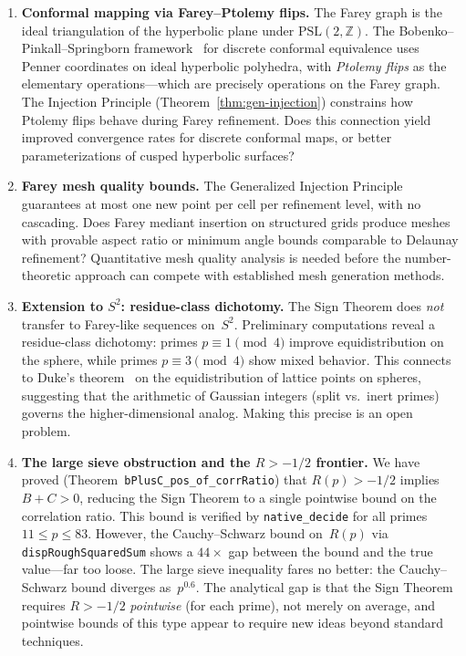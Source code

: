 \documentclass[11pt]{article}
\theoremstyle{definition}
\newcommand{\Z}{\mathbb{Z}}
\begin{document}
\begin{enumerate}
  \item \textbf{Conformal mapping via Farey--Ptolemy flips.}
    The Farey graph is the ideal triangulation of the hyperbolic
    plane under $\mathrm{PSL}(2,\Z)$.  The Bobenko--Pinkall--Springborn
    framework~\cite{BPS2015} for discrete conformal equivalence
    uses Penner coordinates on ideal hyperbolic polyhedra, with
    \emph{Ptolemy flips} as the elementary operations---which are
    precisely operations on the Farey graph.  The Injection
    Principle (Theorem~\ref{thm:gen-injection}) constrains how
    Ptolemy flips behave during Farey refinement.  Does this
    connection yield improved convergence rates for discrete
    conformal maps, or better parameterizations of cusped
    hyperbolic surfaces?

  \item \textbf{Farey mesh quality bounds.}
    The Generalized Injection Principle guarantees at most one
    new point per cell per refinement level, with no cascading.
    Does Farey mediant insertion on structured grids produce
    meshes with provable aspect ratio or minimum angle bounds
    comparable to Delaunay refinement?  Quantitative mesh
    quality analysis is needed before the number-theoretic
    approach can compete with established mesh generation methods.

  \item \textbf{Extension to $S^2$: residue-class dichotomy.}
    The Sign Theorem does \emph{not} transfer to Farey-like
    sequences on~$S^2$.  Preliminary computations reveal a
    residue-class dichotomy: primes $p \equiv 1 \pmod{4}$
    improve equidistribution on the sphere, while primes
    $p \equiv 3 \pmod{4}$ show mixed behavior.  This connects
    to Duke's theorem~\cite{Duke1988} on the equidistribution
    of lattice points on spheres, suggesting that the arithmetic
    of Gaussian integers (split vs.\ inert primes) governs the
    higher-dimensional analog.  Making this precise is an open
    problem.

  \item \textbf{The large sieve obstruction and the $R > -1/2$ frontier.}
    We have proved (Theorem~\texttt{bPlusC\_pos\_of\_corrRatio})
    that $R(p) > -1/2$ implies $B + C > 0$, reducing the Sign
    Theorem to a single pointwise bound on the correlation ratio.
    This bound is verified by \texttt{native\_decide} for all
    primes $11 \le p \le 83$.  However, the Cauchy--Schwarz
    bound on~$R(p)$ via \texttt{dispRoughSquaredSum} shows a
    $44\times$ gap between the bound and the true value---far
    too loose.  The large sieve inequality fares no better:
    the Cauchy--Schwarz bound diverges as~$p^{0.6}$.  The
    analytical gap is that the Sign Theorem requires
    $R > -1/2$ \emph{pointwise} (for each prime), not merely
    on average, and pointwise bounds of this type appear to
    require new ideas beyond standard techniques.


\end{enumerate}
\end{document}
